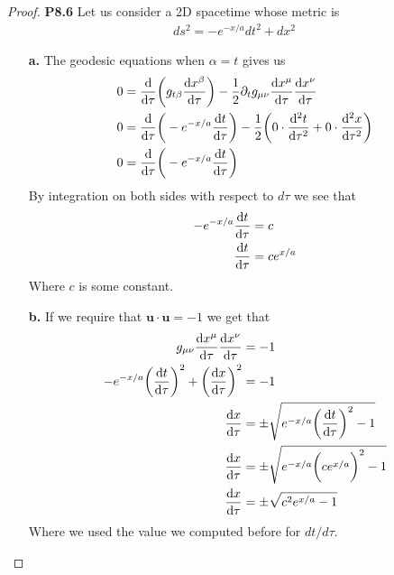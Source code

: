 \documentclass[11pt]{article}
\theoremstyle{definition}
\begin{document}
\begin{proof}{\textbf{P8.6}}
    Let us consider a 2D spacetime whose metric is
    \begin{align*}
        ds^2 = -e^{-x/a}dt^2 + dx^2
    \end{align*}
    \begin{itemize}
        \item [\textbf{a.}] The geodesic equations when $\alpha = t$ gives us
        \begin{align*}
            0 &= \derivative{}{\tau}\bigg(
            g_{t\beta}\derivative{x^\beta}{\tau}\bigg)
            - \frac{1}{2}\partial_t g_{\mu\nu}\derivative{x^\mu}{\tau}
            \derivative{x^\nu}{\tau}\\
            0 &= \derivative{}{\tau}\bigg(
                -e^{-x/a}\derivative{t}{\tau}\bigg)
                - \frac{1}{2} \bigg(
                0\cdot\derivative[2]{t}{\tau}
                + 0\cdot\derivative[2]{x}{\tau}
            \bigg)\\
            0 &= \derivative{}{\tau}\bigg(-e^{-x/a}\derivative{t}{\tau}\bigg)
        \end{align*}
        By integration on both sides with respect to $d\tau$ we see that
        \begin{align*}
            -e^{-x/a}\derivative{t}{\tau} &= c\\
            \derivative{t}{\tau} &= ce^{x/a}
        \end{align*}
        Where $c$ is some constant.

        \item [\textbf{b.}] If we require that $\bm{u\cdot u} = -1$ we get that
        \begin{align*}
            g_{\mu\nu}\derivative{x^\mu}{\tau}\derivative{x^\nu}{\tau} &= -1\\
            -e^{-x/a}\bigg(\derivative{t}{\tau}\bigg)^2
            + \bigg(\derivative{x}{\tau}\bigg)^2 &= -1\\
            \derivative{x}{\tau}
            &= \pm\sqrt{e^{-x/a}\bigg(\derivative{t}{\tau}\bigg)^2 - 1}\\
            \derivative{x}{\tau}
            &= \pm\sqrt{e^{-x/a}\bigg(c e^{x/a}\bigg)^2 - 1}\\
            \derivative{x}{\tau}
            &= \pm\sqrt{c^2 e^{x/a} - 1}
        \end{align*}
        Where we used the value we computed before for $dt/d\tau$.
        

\end{itemize}
\end{proof}
\end{document}
